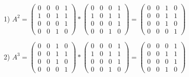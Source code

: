 \begin{enumerate}
\item[1)]$A^2 = \begin{pmatrix}0 & 0 & 0 & 1 \\1 & 0 & 1 & 1\\0 & 0 & 0 & 1\\0 & 0 & 1 & 0\end{pmatrix}*\begin{pmatrix}0 & 0 & 0 & 1 \\1 & 0 & 1 & 1\\0 & 0 & 0 & 1\\0 & 0 & 1 & 0\end{pmatrix} = \begin{pmatrix}0 & 0 & 1 & 0 \\0 & 0 & 1 & 1\\0 & 0 & 1 & 0\\0 & 0 & 0 & 1\end{pmatrix}$

\item[2)]$A^3 = \begin{pmatrix}0 & 0 & 1 & 0 \\0 & 0 & 1 & 1\\0 & 0 & 1 & 0\\0 & 0 & 0 & 1\end{pmatrix}*\begin{pmatrix}0 & 0 & 0 & 1 \\1 & 0 & 1 & 1\\0 & 0 & 0 & 1\\0 & 0 & 1 & 0\end{pmatrix} = \begin{pmatrix}0 & 0 & 0 & 1 \\0 & 0 & 1 & 1\\0 & 0 & 0 & 1\\0 & 0 & 1 & 0\end{pmatrix}$


\end{enumerate}
